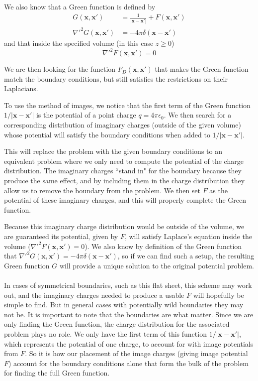 \documentclass{article}
\begin{document}
We also know that a Green function is defined by
\begin{align*}
G(\mathbf{x},\mathbf{x'}) &= \frac{1}{\left| \mathbf{x}-\mathbf{x'} \right|} + F(\mathbf{x},\mathbf{x'})\\
\nabla'^{2} G(\mathbf{x},\mathbf{x'}) &= -4\pi\delta(\mathbf{x}-\mathbf{x'})
\end{align*}
and that inside the specified volume (in this case $z\ge 0$) 
\[ \nabla'^{2} F(\mathbf{x},\mathbf{x'}) = 0 \]

We are then looking for the function $F_{D}(\mathbf{x},\mathbf{x'})$ that makes the Green function match the boundary conditions, but still satisfies the restrictions on their Laplacians.

To use the method of images, we notice that the first term of the Green function $1/|\mathbf{x}-\mathbf{x'}|$ is the potential of a point charge $q=4\pi\epsilon_{0}$. We then search for a corresponding distribution of imaginary charges (outside of the given volume) whose potential will satisfy the boundary conditions when added to $1/|\mathbf{x}-\mathbf{x'}|$.

This will replace the problem with the given boundary conditions to an equivalent problem where we only need to compute the potential of the charge distribution. The imaginary charges ``stand in" for the boundary because they produce the same effect, and by including them in the charge distribution they allow us to remove the boundary from the problem. We then set $F$ as the potential of these imaginary charges, and this will properly complete the Green function.

Because this imaginary charge distribution would be outside of the volume, we are guaranteed its potential, given by $F$, will satisfy Laplace's equation inside the volume ($\nabla'^{2} F(\mathbf{x},\mathbf{x'}) = 0$). We also know by definition of the Green function that $\nabla'^{2} G(\mathbf{x},\mathbf{x'}) = -4\pi\delta(\mathbf{x}-\mathbf{x'})$, so if we can find such a setup, the resulting Green function $G$ will provide a unique solution to the original potential problem.\\
\\
In cases of symmetrical boundaries, such as this flat sheet, this scheme may work out, and the imaginary charges needed to produce a usable $F$ will hopefully be simple to find. But in general cases with potentially wild boundaries they may not be. It is important to note that the boundaries are what matter. Since we are only finding the Green function, the charge distribution for the associated problem plays no role. We only have the first term of this function $1/|\mathbf{x}-\mathbf{x'}|$, which represents the potential of one charge, to account for with image potentials from $F$. So it is how our placement of the image charges (giving image potential $F$) account for the boundary conditions alone that form the bulk of the problem for finding the full Green function.
\end{document}
